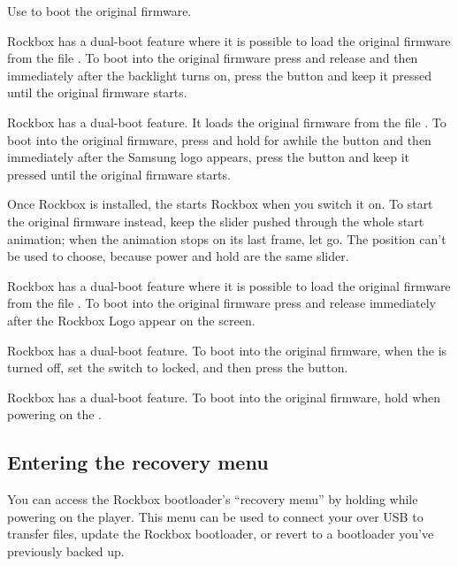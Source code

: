 {  
    {
    Use \ButtonPower{} to boot the original \playerman{} firmware.
    }

    {
    Rockbox has a dual-boot feature where it is possible to load the original firmware from
    the file . To boot into the original firmware press and release
    \ButtonPower{} and then immediately after the backlight turns on, press the \ButtonOK{}
    button and keep it pressed until the original firmware starts.
    }

    {
    Rockbox has a dual-boot feature. It loads the original firmware from
    the file . To boot into the original firmware, press and hold
    for awhile the \ButtonPlay{} button and then immediately after the Samsung logo appears,
    press the \ButtonLeft{} button and keep it pressed until the original firmware starts.
    }

    {
    Once Rockbox is installed, the \dap{} starts Rockbox when you switch it
    on. To start the original firmware instead, keep the \ButtonPower{} slider
    pushed through the whole start animation; when the animation stops on its
    last frame, let go. The \ButtonHold{} position can't be used to choose,
    because power and hold are the same slider.
    }

    {
    Rockbox has a dual-boot feature where it is possible to load the original firmware from
    the file . To boot into the original firmware press and release
    \ButtonPower{} immediately after the Rockbox Logo appear on the screen.
    }

    {
    Rockbox has a dual-boot feature. To boot into the original firmware,
    when the \dap{} is turned off, set the \ButtonLock{} switch to locked,
    and then press the \ButtonPower{} button.
    }

    {
    Rockbox has a dual-boot feature. To boot into the original firmware,
    hold \ActionBootOFPlayer{} when powering on the \dap{}.


    \subsection{Entering the recovery menu}
    You can access the Rockbox bootloader's ``recovery menu'' by holding
    \ActionBootRecoveryMenu{} while powering on the player. This menu can be
    used to connect your \dap{} over USB to transfer files, update the Rockbox
    bootloader, or revert to a bootloader you've previously backed up.
    }

  }
